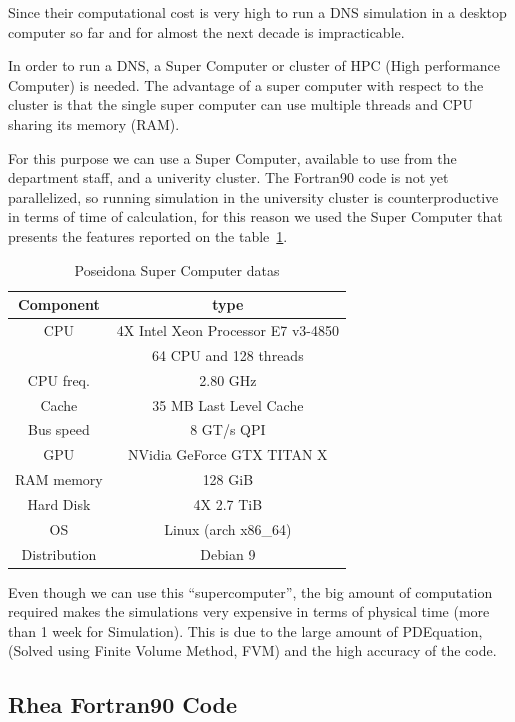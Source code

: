 Since their computational cost is very high to run a DNS simulation in a desktop computer so far and for almost the next decade is  impracticable. 

In order to run a DNS, a Super Computer or cluster of HPC (High performance Computer) is needed. The advantage of a super computer with respect to the cluster is that the single super computer can use multiple threads and CPU sharing its memory (RAM). 

For this purpose we can use a Super Computer, available to use from the department staff, and a univerity cluster. The Fortran90 code is not yet parallelized, so running simulation in the university cluster is counterproductive in terms of time of calculation, for this reason we used the Super Computer that presents the features reported on the table~\ref{value}.


\begin{table}[h]
\centering
\caption{Poseidona Super Computer datas}
\label{value}
\begin{tabular}{cc}
\toprule
\textbf{Component} &\textbf{type}  \\
\midrule
CPU & 4X Intel Xeon Processor E7 v3-4850   \\
    & 64 CPU and 128 threads   \\
CPU freq. &   2.80 GHz   \\ 
Cache     & 35 MB Last Level Cache\\
Bus speed & 8 GT/s QPI\\
GPU & NVidia GeForce GTX TITAN X\\
RAM memory                 & 128 GiB  \\
Hard Disk             & 4X 2.7 TiB  \\
OS           & Linux (arch x86\_64) \\ 
Distribution & Debian 9  \\ 
\bottomrule
\end{tabular}
\end{table}
Even though we can use this ``supercomputer'', the big amount of computation required makes the simulations very expensive in terms of physical time (more than 1 week for Simulation). 
This is due to the large amount of PDEquation, (Solved using Finite Volume Method, FVM) and the high accuracy of the code.  


\subsection{Rhea Fortran90 Code}\label{sec:code}

